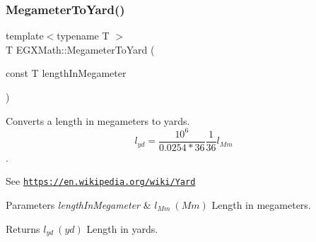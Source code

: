 \subsubsection{\texorpdfstring{Megameter\+To\+Yard()}{MegameterToYard()}}
{\footnotesize\ttfamily template$<$typename T $>$ \\
T E\+G\+X\+Math\+::\+Megameter\+To\+Yard (\begin{DoxyParamCaption}\item[{const T}]{length\+In\+Megameter }\end{DoxyParamCaption})}



Converts a length in megameters to yards. \[ l_{yd}= \frac{10^{6}}{0.0254 * 36} \frac{1}{36} l_{Mm} \]. 

See \href{https://en.wikipedia.org/wiki/Yard}{\tt https\+://en.\+wikipedia.\+org/wiki/\+Yard} 
\begin{DoxyParams}{Parameters}
{\em length\+In\+Megameter} & $ l_{Mm}\ (Mm)$ Length in megameters. \\
\hline
\end{DoxyParams}
\begin{DoxyReturn}{Returns}
$ l_{yd}\ (yd)$ Length in yards. 
\end{DoxyReturn}
